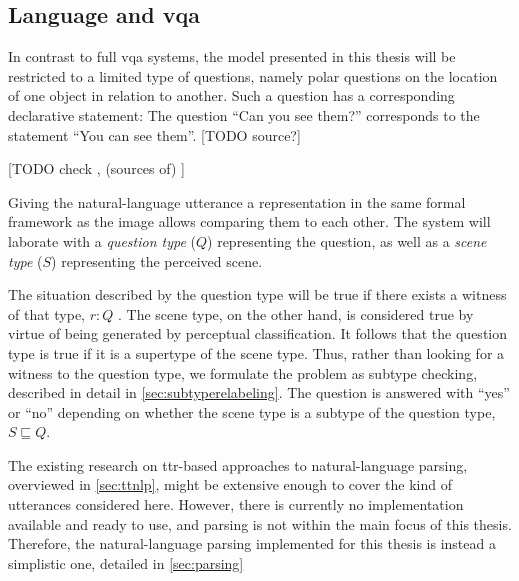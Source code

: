 \subsection{Language and \acrfull{vqa}}
\label{sec:languagevqa}

In contrast to full \gls{vqa} systems, the model presented in this thesis will be restricted to a limited type of questions, namely polar questions on the location of one object in relation to another.
Such a question has a corresponding declarative statement:
The question ``Can you see them?'' corresponds to the statement ``You can see them''.
[TODO source?]

[TODO check \cite{RooyPolarQuestions2003}, (sources of) \cite{AloniQuantificationConceptualCovers2001}]

Giving the natural-language utterance a representation in the same formal framework as the image allows comparing them to each other.
The system will laborate with a \textit{question type} ($Q$) representing the question, as well as a \textit{scene type} ($S$) representing the perceived scene.

The situation described by the question type will be true if there exists a witness of that type, $r:Q$ \citep{BarwiseSituationsAttitudes1981,CooperAustiniantruthattitudes2005}.
The scene type, on the other hand, is considered true by virtue of being generated by perceptual classification.
It follows that the question type is true if it is a supertype of the scene type.
Thus, rather than looking for a witness to the question type, we formulate the problem as subtype checking, described in detail in \autoref{sec:subtyperelabeling}.
The question is answered with ``yes'' or ``no'' depending on whether the scene type is a subtype of the question type, $S \sqsubseteq Q$.

The existing research on \gls{ttr}-based approaches to natural-language parsing, overviewed in \autoref{sec:ttnlp}, might be extensive enough to cover the kind of utterances considered here.
However, there is currently no implementation available and ready to use, and parsing is not within the main focus of this thesis.
Therefore, the natural-language parsing implemented for this thesis is instead a simplistic one, detailed in \autoref{sec:parsing}

